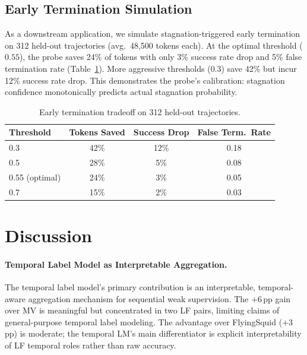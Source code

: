 \documentclass[11pt]{article}
\begin{document}
\subsection{Early Termination Simulation}
\label{sec:early_termination}

As a downstream application, we simulate stagnation-triggered early termination on 312 held-out trajectories (avg.\ 48,500 tokens each).
At the optimal threshold ($0.55$), the probe saves 24\% of tokens with only 3\% success rate drop and 5\% false termination rate (Table~\ref{tab:termination}).
More aggressive thresholds ($0.3$) save 42\% but incur 12\% success rate drop.
This demonstrates the probe's calibration: stagnation confidence monotonically predicts actual stagnation probability.

\begin{table}[t]
\centering
\caption{Early termination tradeoff on 312 held-out trajectories.}
\label{tab:termination}
\small
\begin{tabular}{lccc}
\toprule
Threshold & Tokens Saved & Success Drop & False Term.\ Rate \\
\midrule
0.3 & 42\% & 12\% & 0.18 \\
0.5 & 28\% & 5\% & 0.08 \\
0.55 (optimal) & 24\% & 3\% & 0.05 \\
0.7 & 15\% & 2\% & 0.03 \\
\bottomrule
\end{tabular}
\end{table}

\section{Discussion}
\label{sec:discussion}

\paragraph{Temporal Label Model as Interpretable Aggregation.}
The temporal label model's primary contribution is an interpretable, temporal-aware aggregation mechanism for sequential weak supervision.
The $+6$\,pp gain over MV is meaningful but concentrated in two LF pairs, limiting claims of general-purpose temporal label modeling.
The advantage over FlyingSquid ($+3$\,pp) is moderate; the temporal LM's main differentiator is explicit interpretability of LF temporal roles rather than raw accuracy.
\end{document}
